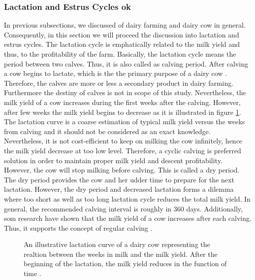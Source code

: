 \documentclass[english,12pt,a4paper,pdftex,elec,utf8]{aaltothesis}
\begin{document}
\subsubsection{Lactation and Estrus Cycles ok} \label{lactationandestruscyclessection}

In previous subsections, we discussed of dairy farming and dairy cow in general. Consequently, in this section we will proceed the discussion into lactation and estrus cycles. The lactation cycle is emphatically related to the milk yield and thus, to the profitability of the farm. Basically, the lactation cycle means the period between two calves. Thus, it is also called as calving period. After calving a cow begins to lactate, which is the the primary purpose of a dairy cow \cite{lehmahavaintoja}. Therefore, the calves are more or less a secondary product in dairy farming. Furthermore the destiny of calves is not in scope of this study. Nevertheless, the milk yield of a cow increases during the first weeks after the calving. However, after few weeks the milk yield begins to decrease as it is illustrated in figure \ref{lactationapproximation}. The lactation curve is a coarse estimation of typical milk yield versus the weeks from calving and it should not be considered as an exact knowledge. Nevertheless, it is not cost-efficient to keep on milking the cow infinitely, hence the milk yield decrease at too low level. Therefore, a cyclic calving is preferred solution in order to maintain proper milk yield and descent profitability. However, the cow will stop milking before calving. This is called a dry period. The dry period provides the cow and her udder time to prepare for the next lactation. However, the dry  period and decreased lactation forms a dilemma where too short as well as too long lactation cycle reduces the total milk yield. In general, the recommended calving interval is roughly in 360 days. Additionally, som research have shown that the milk yield of a cow increases after each calving. Thus, it supports the concept of regular calving \cite{lehmientuotoskasvaa}.

 \begin{figure}
 \centering
    \caption{An illustrative lactation curve of a dairy cow representing the realtion between the weeks in milk and the milk yield. After the beginning of the lactation, the milk yield reduces in the function of time \cite{lactationcurve}.} \label{lactationapproximation}
 \end{figure}
\end{document}
